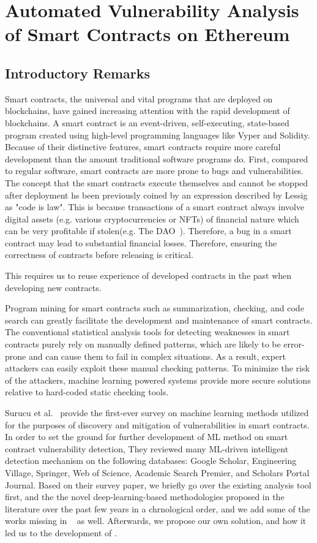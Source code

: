 \chapter{Automated Vulnerability Analysis of Smart Contracts on Ethereum} 
\label{ch:Slither-simil}

\section{Introductory Remarks}
Smart contracts, the universal and vital programs that are deployed on blockchains, have gained increasing attention with the rapid development of blockchains.
A smart contract is an event-driven, self-executing, state-based program created using high-level programming languages like Vyper and Solidity.
Because of their distinctive features, smart contracts require more careful development than the amount traditional software programs do.
First, compared to regular software, smart contracts are more prone to bugs and vulnerabilities.
The concept that the smart contracts execute themselves and cannot be stopped after deployment hs been previously coined by an expression described by Lessig~\cite{lessig2009code} as "code is law".
This is because transactions of a smart contract always involve digital assets (e.g. various cryptocurrencies or NFTs) of financial nature which can be very profitable if stolen(e.g. The DAO~\cite{dao}).
Therefore, a bug in a smart contract may lead to substantial financial losses.
Therefore, ensuring the correctness of contracts before releasing is critical.

This requires us to reuse experience of developed contracts in the past when developing new contracts.

Program mining for smart contracts such as summarization, checking, and code search can greatly facilitate the development and maintenance of smart contracts.
The conventional statistical analysis tools for detecting weaknesses in smart contracts purely rely on manually defined patterns, which are likely to be error-prone and can cause them to fail in complex situations.
As a result, expert attackers can easily exploit these manual checking patterns.
To minimize the risk of the attackers, machine learning powered systems provide more secure solutions relative to hard-coded static checking tools.


Surucu et al.~\cite{surucu2022survey} provide the first-ever survey on machine learning methods utilized for the purposes of discovery and mitigation of vulnerabilities in smart contracts.
In order to set the ground for further development of ML method on smart contract vulnerability detection, They reviewed many ML-driven intelligent detection mechanism on the following databases: Google Scholar, Engineering Village, Springer, Web of Science, Academic Search Premier, and Scholars Portal Journal.
Based on their survey paper, we briefly go over the existing analysis tool first, and the the novel deep-learning-based methodologies proposed in the literature over the past few years in a chrnological order, and we add some of the works missing in ~\cite{surucu2022survey} as well.
Afterwards, we propose our own solution, \slithersimil and how it led us to the development of \etherbase.


